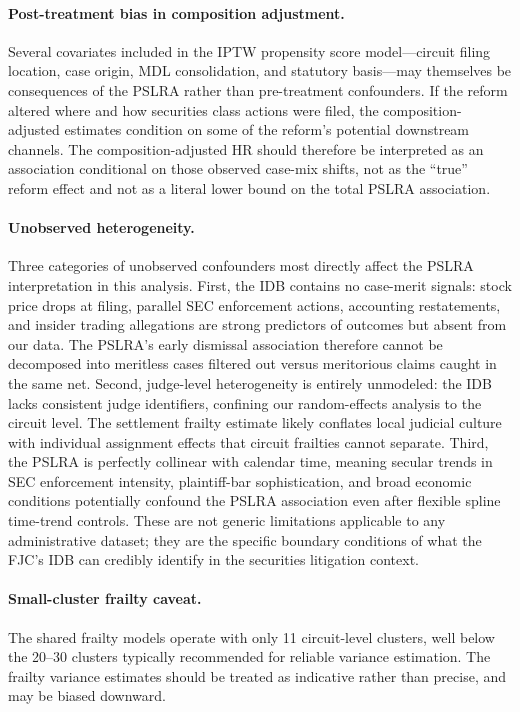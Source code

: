 \paragraph{Post-treatment bias in composition adjustment.}
Several covariates included in the IPTW propensity score
model---circuit filing location, case origin, MDL
consolidation, and statutory basis---may themselves be
consequences of the PSLRA rather than pre-treatment
confounders. If the reform altered where and how securities
class actions were filed, the composition-adjusted estimates
condition on some of the reform's potential downstream
channels. The composition-adjusted HR should therefore be
interpreted as an association conditional on those observed
case-mix shifts, not as the
``true'' reform effect and not as a literal lower bound on
the total PSLRA association.

\paragraph{Unobserved heterogeneity.}
Three categories of unobserved confounders most directly affect the PSLRA interpretation in this analysis. First, the IDB contains no case-merit signals: stock price drops at filing, parallel SEC enforcement actions, accounting restatements, and insider trading allegations are strong predictors of outcomes \citep{cox2008, johnson2001} but absent from our data. The PSLRA's early dismissal association therefore cannot be decomposed into meritless cases filtered out versus meritorious claims caught in the same net. Second, judge-level heterogeneity is entirely unmodeled: the IDB lacks consistent judge identifiers, confining our random-effects analysis to the circuit level. The settlement frailty estimate likely conflates local judicial culture with individual assignment effects that circuit frailties cannot separate. Third, the PSLRA is perfectly collinear with calendar time, meaning secular trends in SEC enforcement intensity, plaintiff-bar sophistication, and broad economic conditions potentially confound the PSLRA association even after flexible spline time-trend controls. These are not generic limitations applicable to any administrative dataset; they are the specific boundary conditions of what the FJC's IDB can credibly identify in the securities litigation context.

\paragraph{Small-cluster frailty caveat.}
The shared frailty models operate with only 11 circuit-level
clusters, well below the 20--30 clusters typically
recommended for reliable variance estimation. The frailty
variance estimates should be treated as indicative rather than
precise, and may be biased downward.

